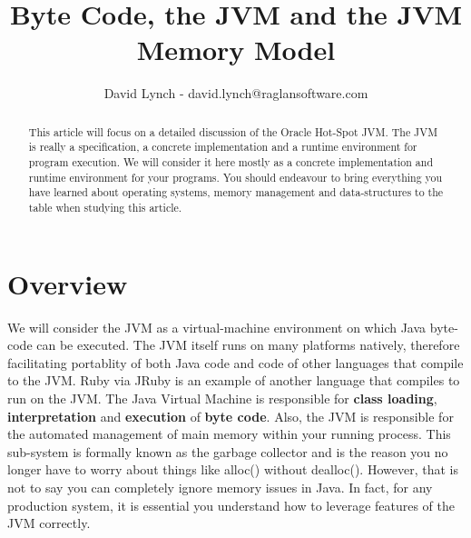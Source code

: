 \documentclass[10pt,a4paper]{article}
\title{Byte Code, the JVM and the JVM Memory Model}
\author{David Lynch - david.lynch@raglansoftware.com }
\begin{document}
\maketitle
\begin{abstract}
This article will focus on a detailed discussion of the Oracle Hot-Spot JVM. The JVM is really a specification, a concrete implementation and a runtime environment for program execution. We will consider it here mostly as a concrete implementation and runtime environment for your programs. You should endeavour to bring everything you have learned about operating systems, memory management and data-structures to the table when studying this article. 
\end{abstract}

\section{Overview}
We will consider the JVM as a virtual-machine environment on which Java byte-code can be executed. The JVM itself runs on many platforms natively, therefore facilitating portablity of both Java code and code of other languages that compile to the JVM. Ruby via JRuby is an example of another language that compiles to run on the JVM. The Java Virtual Machine is responsible for {\bf class loading}, {\bf interpretation} and {\bf execution} of {\bf byte code}. Also, the JVM is responsible for the automated management of main memory within your running process. This sub-system is formally known as the garbage collector and is the reason you no longer have to worry about things like alloc() without dealloc(). However, that is not to say you can completely ignore memory issues in Java. In fact, for any production system, it is essential you understand how to leverage features of the JVM correctly. 
\end{document}
